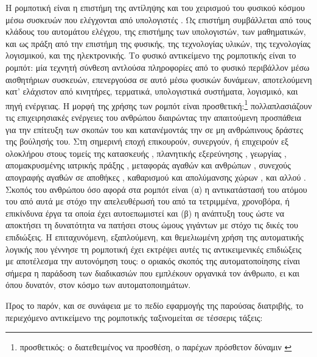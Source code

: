 Η ρομποτική είναι η επιστήμη της αντίληψης και του χειρισμού του φυσικού κόσμου
μέσω συσκευών που ελέγχονται από υπολογιστές \cite{thrun2005probabilistic}.  Ως
επιστήμη συμβάλλεται από τους κλάδους του αυτομάτου ελέγχου, της επιστήμης των
υπολογιστών, των μαθηματικών, και ως πράξη από την επιστήμη της φυσικής, της
τεχνολογίας υλικών, της τεχνολογίας λογισμικού, και της ηλεκτρονικής. Το φυσικό
αντικείμενο της ρομποτικής είναι το ρομπότ: μία τεχνητή σύνθεση αντλούσα
πληροφορίες από το φυσικό περιβάλλον μέσω αισθητήριων συσκευών, επενεργούσα σε
αυτό μέσω φυσικών δυνάμεων, αποτελούμενη κατ' ελάχιστον από κινητήρες,
τερματικά, υπολογιστικά συστήματα, λογισμικό, και πηγή ενέργειας. Η μορφή της
χρήσης των ρομπότ είναι προσθετική:\footnote{προσθετικός: ο διατεθειμένος να
προσθέση, ο παρέχων πρόσθετον δύναμιν \cite{liddell_scott}} πολλαπλασιάζουν τις
επιχειρησιακές ενέργειες του ανθρώπου διαιρώντας την απαιτούμενη προσπάθεια για
την επίτευξη των σκοπών του και κατανέμοντάς την σε μη ανθρώπινους δράστες της
βούλησής του.  Στη σημερινή εποχή επικουρούν, συνεργούν, ή επιχειρούν εξ
ολοκλήρου στους τομείς της κατασκευής \cite{Wang2019}, πλανητικής εξερεύνησης
\cite{Williford2018}, γεωργίας \cite{Vasconez2019,Noguchi2011}, απομακρυσμένης
ιατρικής πράξης \cite{Sheetz2020}, μεταφοράς αγαθών και ανθρώπων
\cite{Dikmen2016,Lima2018,Simpson2019}, συνεχούς απογραφής αγαθών σε αποθήκες
\cite{Dimitriou2021}, καθαρισμού και απολύμανσης χώρων \cite{Khan2020}, και
αλλού \cite{security_robots,hotel_robots,Chen2021,Nicholson2008}.  Σκοπός του
ανθρώπου όσο αφορά στα ρομπότ είναι (α) η αντικατάστασή του ατόμου του από αυτά
με στόχο την απελευθέρωσή του από τα τετριμμένα, χρονοβόρα, ή επικίνδυνα έργα
τα οποία έχει αυτοεπωμιστεί και (β) η ανάπτυξη τους ώστε να αποκτήσει τη
δυνατότητα να πατήσει στους ώμους γιγάντων με στόχο τις δικές του επιδιώξεις. Η
επιταχυνόμενη, εξαπλούμενη, και θεμελιωμένη χρήση της αυτοματικής λογικής που
γέννησε τη ρομποτική έχει εκτρέψει αυτές τις αντικειμενικές επιδιώξεις με
αποτέλεσμα την αυτονόμηση τους: ο οριακός σκοπός της αυτοματοποίησης είναι
σήμερα η παράδοση των διαδικασιών που εμπλέκουν οργανικά τον άνθρωπο, ει και
όπου δυνατόν, στον κόσμο των αυτοματοποιημάτων.

Προς το παρόν, και σε συνάφεια με το πεδίο εφαρμογής της παρούσας διατριβής,
το περιεχόμενο αντικείμενο της ρομποτικής ταξινομείται σε τέσσερις τάξεις:

